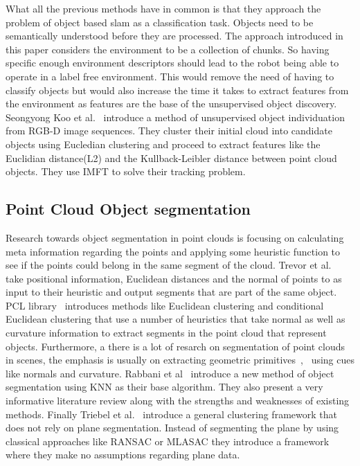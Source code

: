 \documentclass[twoside,hidelinks]{article}
\begin{document}
What all the previous methods have in common is that they approach the problem of object based slam as a classification task. Objects need to be semantically understood before they are processed. The approach introduced in this paper considers the environment to be a collection of chunks. So having specific enough environment descriptors should lead to the robot being able to operate in a label free environment. This would remove the need of having to classify objects but would also increase the time it takes to extract features from the environment as features are the base of the unsupervised object discovery.
Seongyong Koo et al.~\cite{objectDisc} introduce a method of unsupervised object individuation from RGB-D image sequences. They cluster their initial cloud into candidate objects using Eucledian clustering and proceed to extract features like the Euclidian distance(L2) and the Kullback-Leibler distance between point cloud objects. They use IMFT to solve their tracking problem.

\subsection{Point Cloud Object segmentation}

Research towards object segmentation in point clouds is focusing on calculating meta information regarding the points and applying some heuristic function to see if the points could belong in the same segment of the cloud. Trevor et al.~\cite{pointSeg} take positional information, Euclidean distances and the normal of points to as input to their heuristic and output segments that are part of the same object. PCL library~\cite{pcl} introduces methods like Euclidean clustering and conditional Euclidean clustering that use a number of heuristics that take normal as well as curvature information to extract segments in the point cloud that represent objects. Furthermore, a there is a lot of resarch on segmentation of point clouds in scenes, the emphasis is usually on extracting geometric primitives~\cite{planarSeg},~\cite{planarSeg2} using cues like normals and curvature. Rabbani et al~\cite{segOverview} introduce a new method of object segmentation using KNN as their base algorithm. They also present a very informative literature review along with the strengths and weaknesses of existing methods. Finally Triebel et al.~\cite{smartSeg} introduce a general clustering framework that does not rely on plane segmentation. Instead of segmenting the plane by using classical approaches like RANSAC or MLASAC they introduce a framework where they make no assumptions regarding plane data. 
\end{document}
